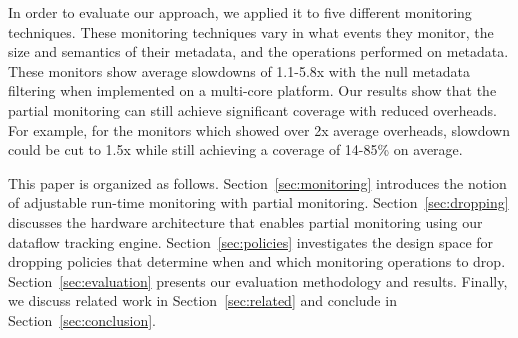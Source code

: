 
In order to evaluate our approach, we applied it to five different monitoring
techniques. These monitoring techniques vary in what events they monitor, the
size and semantics of their metadata, and the operations performed on metadata.
These monitors show average slowdowns of 1.1-5.8x with the null metadata filtering when
implemented on a multi-core platform.
Our results show that the partial monitoring can still achieve significant
coverage with reduced overheads. For example, for the monitors which showed over 2x
average overheads, slowdown could be cut to 1.5x while still achieving a
coverage of 14-85\% on average.

This paper is organized as follows. Section~\ref{sec:monitoring} introduces the notion
of adjustable run-time monitoring with partial monitoring.
Section~\ref{sec:dropping} discusses the hardware architecture that enables 
partial monitoring using our dataflow tracking engine.
Section~\ref{sec:policies}
investigates the design space for dropping policies that determine when and which
monitoring operations to drop.
Section~\ref{sec:evaluation} presents our evaluation methodology and
results. Finally, we discuss related work in Section~\ref{sec:related} and
conclude in Section~\ref{sec:conclusion}.

